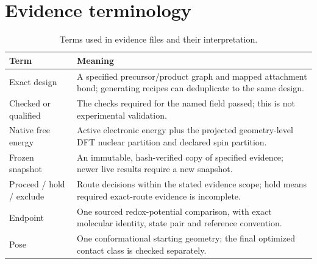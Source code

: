 \documentclass[11pt]{article}
\begin{document}
\section{Evidence terminology}
\begin{table}[H]\centering\small
\caption{Terms used in evidence files and their interpretation.}
\begin{tabular}{p{.24\linewidth}p{.67\linewidth}}\toprule
Term & Meaning\\\midrule
Exact design & A specified precursor/product graph and mapped attachment bond; generating recipes can deduplicate to the same design.\\
Checked or qualified & The checks required for the named field passed; this is not experimental validation.\\
Native free energy & Active electronic energy plus the projected geometry-level DFT nuclear partition and declared spin partition.\\
Frozen snapshot & An immutable, hash-verified copy of specified evidence; newer live results require a new snapshot.\\
Proceed / hold / exclude & Route decisions within the stated evidence scope; hold means required exact-route evidence is incomplete.\\
Endpoint & One sourced redox-potential comparison, with exact molecular identity, state pair and reference convention.\\
Pose & One conformational starting geometry; the final optimized contact class is checked separately.\\
\bottomrule\end{tabular}\end{table}

\end{document}
